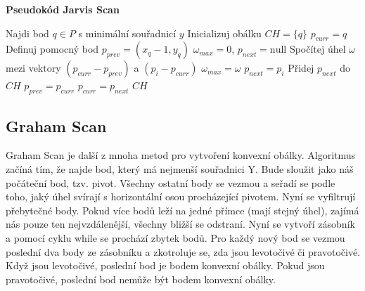 \textbf{Pseudokód Jarvis Scan}
\begin{algorithm}[H]
\caption{Jarvis Scan ($P = \{p_1, \dots, p_n\}$)}
\label{alg:jarvis}
\begin{algorithmic}[1]
\State Najdi bod $q \in P$ s minimální souřadnicí $y$
\State Inicializuj obálku $CH = \{q\}$
\State $p_{curr} = q$
\State Definuj pomocný bod $p_{prev} = (x_q - 1, y_q)$ 
\Repeat
    \State $\omega_{max} = 0$, $p_{next} = \text{null}$
        \State Spočítej úhel $\omega$ mezi vektory $(p_{curr} - p_{prev})$ a $(p_i - p_{curr})$
            \State $\omega_{max} = \omega$
            \State $p_{next} = p_i$
        \EndIf
    \EndFor
    \State Přidej $p_{next}$ do $CH$
    \State $p_{prev} = p_{curr}$
    \State $p_{curr} = p_{next}$
\State \Return $CH$
\end{algorithmic}
\end{algorithm}



\subsection{Graham Scan}
Graham Scan je další z mnoha metod pro vytvoření konvexní obálky. 
Algoritmus začíná tím, že najde bod, který má nejmenší souřadnici Y. Bude sloužit jako náš počáteční bod, tzv. pivot.
Všechny ostatní body se vezmou a seřadí se podle toho, jaký úhel svírají s horizontální osou procházející pivotem.
Nyní se vyfiltrují přebytečné body.
Pokud více bodů leží na jedné přímce (mají stejný úhel), zajímá nás pouze ten nejvzdálenější, všechny bližší se odstraní.
Nyní se vytvoří zásobník a pomocí cyklu while se prochází zbytek bodů.
Pro každý nový bod se vezmou poslední dva body ze zásobníku a zkotroluje se, zda jsou levotočivé či pravotočivé. Když jsou levotočivé, poslední bod je bodem konvexní obálky. Pokud jsou pravotočivé, poslední bod nemůže být bodem konvexní obálky. 

